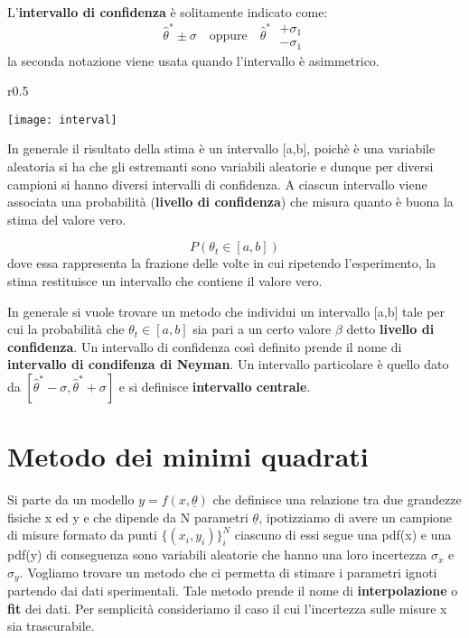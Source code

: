 \noindent L'\textbf{intervallo di confidenza} \`{e} solitamente indicato come:
\begin{equation}
	\hat{\theta}^* \pm \sigma \quad \text{oppure} \quad \hat{\theta}^* \; \begin{matrix}
		+\sigma_1 \\ - \sigma_1
	\end{matrix}
\end{equation}
la seconda notazione viene usata quando l'intervallo \`{e} asimmetrico. \newline
\begin{wrapfigure}{r}{0.5 \textwidth}

\vspace{-10pt}
\centering
\texttt{[image: interval]}	

\end{wrapfigure}
In generale il risultato della stima \`{e} un intervallo [a,b], poich\`{e} \`{e} una variabile aleatoria si ha che gli estremanti sono variabili aleatorie e dunque per diversi campioni si hanno diversi intervalli di confidenza. A ciascun intervallo viene associata una probabilit\`{a} (\textbf{livello di confidenza}) che misura quanto \`{e} buona la stima del valore vero.

\begin{equation*}
	P(\theta_t \in [a,b])
\end{equation*}
dove essa rappresenta la frazione delle volte in cui ripetendo l'esperimento, la stima restituisce un intervallo che contiene il valore vero.\newline

In generale si vuole trovare un metodo che individui un intervallo [a,b] tale per cui la probabilit\`{a} che $\theta_t \in [a,b]$ sia pari a un certo valore $\beta$ detto \textbf{livello di confidenza}. Un intervallo di confidenza cos\`{i} definito prende il nome di \textbf{intervallo di condifenza di Neyman}. Un intervallo particolare \`{e} quello dato da $[\hat{\theta}^* - \sigma, \hat{\theta}^* + \sigma]$ e si definisce \textbf{intervallo centrale}.


\section{Metodo dei minimi quadrati}
Si parte da un modello $y = f(x,\underline{\theta})$ che definisce una relazione tra due grandezze fisiche x ed y e che dipende da N parametri $\underline{\theta}$, ipotizziamo di avere un campione di misure formato da punti $\{(x_i,y_i)\}_{i}^N$ ciascuno di essi segue una pdf(x) e una pdf(y) di conseguenza sono variabili aleatorie che hanno una loro incertezza $\sigma_x$ e $\sigma_y$. Vogliamo trovare un metodo che ci permetta di stimare i parametri ignoti partendo dai dati sperimentali. Tale metodo prende il nome di \textbf{interpolazione} o \textbf{fit} dei dati. Per semplicit\`{a} consideriamo il caso il cui l'incertezza sulle misure x sia trascurabile.


